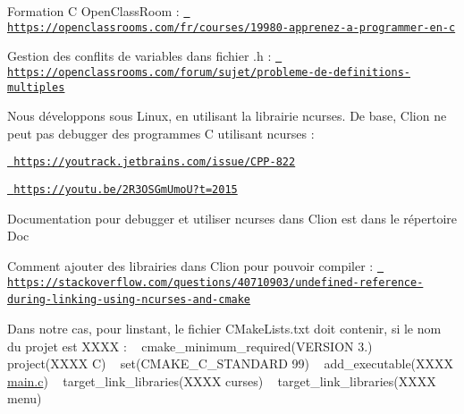 
\begin{DoxyItemize}
\item Formation C Open\+Class\+Room \+: \href{https://openclassrooms.com/fr/courses/19980-apprenez-a-programmer-en-c}{\texttt{ https\+://openclassrooms.\+com/fr/courses/19980-\/apprenez-\/a-\/programmer-\/en-\/c}}
\item Gestion des conflits de variables dans fichier .h \+: \href{https://openclassrooms.com/forum/sujet/probleme-de-definitions-multiples}{\texttt{ https\+://openclassrooms.\+com/forum/sujet/probleme-\/de-\/definitions-\/multiples}}
\item Nous développons sous Linux, en utilisant la librairie ncurses. De base, Clion ne peut pas debugger des programmes C utilisant ncurses \+:
\begin{DoxyItemize}
\item \href{https://youtrack.jetbrains.com/issue/CPP-822}{\texttt{ https\+://youtrack.\+jetbrains.\+com/issue/\+CPP-\/822}}
\item \href{https://youtu.be/2R3OSGmUmoU?t=2015}{\texttt{ https\+://youtu.\+be/2\+R3\+OSGm\+Umo\+U?t=2015}}
\end{DoxyItemize}
\item Documentation pour debugger et utiliser ncurses dans Clion est dans le répertoire Doc ~\newline

\item Comment ajouter des librairies dans Clion pour pouvoir compiler \+: \href{https://stackoverflow.com/questions/40710903/undefined-reference-during-linking-using-ncurses-and-cmake}{\texttt{ https\+://stackoverflow.\+com/questions/40710903/undefined-\/reference-\/during-\/linking-\/using-\/ncurses-\/and-\/cmake}} ~\newline

\item Dans notre cas, pour l\textquotesingle{}instant, le fichier CMake\+Lists.\+txt doit contenir, si le nom du projet est XXXX \+: ~\newline
 cmake\+\_\+minimum\+\_\+required(VERSION 3.) ~\newline
 project(\+XXXX C) ~\newline
 set(\+CMAKE\+\_\+\+C\+\_\+\+STANDARD 99) ~\newline
 add\+\_\+executable(XXXX \mbox{\hyperlink{main_8c}{main.\+c}}) ~\newline
 target\+\_\+link\+\_\+libraries(\+XXXX curses) ~\newline
 target\+\_\+link\+\_\+libraries(\+XXXX menu) ~\newline


\end{DoxyItemize}

